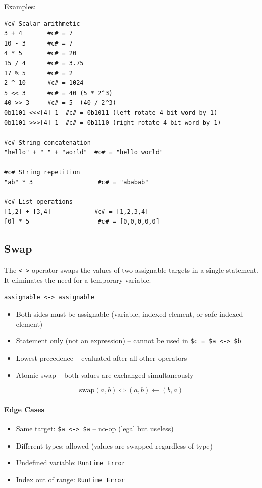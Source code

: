 Examples:
\begin{verbatim}
#c# Scalar arithmetic
3 + 4       #c# = 7
10 - 3      #c# = 7
4 * 5       #c# = 20
15 / 4      #c# = 3.75
17 % 5      #c# = 2
2 ^ 10      #c# = 1024
5 << 3      #c# = 40 (5 * 2^3)
40 >> 3     #c# = 5  (40 / 2^3)
0b1101 <<<[4] 1  #c# = 0b1011 (left rotate 4-bit word by 1)
0b1101 >>>[4] 1  #c# = 0b1110 (right rotate 4-bit word by 1)

#c# String concatenation
"hello" + " " + "world"  #c# = "hello world"

#c# String repetition
"ab" * 3                  #c# = "ababab"

#c# List operations
[1,2] + [3,4]            #c# = [1,2,3,4]
[0] * 5                   #c# = [0,0,0,0,0]
\end{verbatim}

\subsection{Swap}
The \texttt{<->} operator swaps the values of two assignable targets in a single statement. It eliminates the need for a temporary variable.

\begin{verbatim}
assignable <-> assignable
\end{verbatim}

\begin{itemize}
\item Both sides must be assignable (variable, indexed element, or safe-indexed element)
\item Statement only (not an expression) -- cannot be used in \texttt{\$c = \$a <-> \$b}
\item Lowest precedence -- evaluated after all other operators
\item Atomic swap -- both values are exchanged simultaneously
\end{itemize}

\[
\text{swap}(a, b) \iff (a, b) \leftarrow (b, a)
\]

\paragraph{Edge Cases}
\begin{itemize}
\item Same target: \texttt{\$a <-> \$a} -- no-op (legal but useless)
\item Different types: allowed (values are swapped regardless of type)
\item Undefined variable: \texttt{Runtime Error}
\item Index out of range: \texttt{Runtime Error}
\end{itemize}

